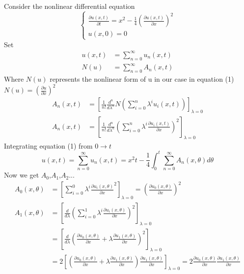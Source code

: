 \documentclass[]{article}
\begin{document}
\setcounter{equation}{0}
\begin{example}
    Consider the nonlinear differential equation
    \begin{equation}
        \begin{cases}
            \displaystyle \frac{\partial u(x,t)}{\partial t} = x^2 - \frac{1}{4}(\frac{\partial u(x,t)}{\partial x})^2
            \\
            \displaystyle u(x,0) = 0
        \end{cases}
    \end{equation}
    Set
    \begin{align*}
        u(x,t) & = \sum_{n=0}^{\infty} u_n(x,t)
        \\
        N(u)   & = \sum_{n=0}^{\infty} A_n(x,t)
    \end{align*}
    Where $N(u)$ represents the nonlinear form of u in our case in equation (1) $N(u) = \left(\frac{\partial u}{\partial x}\right)^2$
    \begin{align*}
        A_n(x,t) & = \left[\frac{1}{n!} \frac{d^n}{d \lambda^n} N\left(\sum_{i=0}^{n}  \lambda^i u_i(x,t)\right)\right]_{\lambda = 0}
        \\
        A_n(x,t) & = \left[\frac{1}{n!} \frac{d^n}{d \lambda^n} \left(\sum_{i=0}^{n}  \lambda^i \frac{\partial u_i(x,t)}{\partial x}\right)^2\right]_{\lambda = 0}
    \end{align*}
    Integrating equation (1) from $0 \to t$
    \[
        u(x,t) = \sum_{n=0}^{\infty} u_n(x,t)  = x^2t - \frac{1}{4} \int_{0}^{t}\sum_{n=0}^{\infty} A_n(x,\theta) d\theta
    \]
    Now we get $A_0$,$A_1$,$A_2$...
    \begin{align*}
        A_0(x,\theta) & = \left[\sum_{i=0}^{0}  \lambda^i \frac{\partial u_i(x,\theta)}{\partial x}^2\right]_{\lambda = 0} = \left(\frac{\partial u_0(x,\theta)}{\partial x}\right)^2
        \\
        A_1(x,\theta) & = \left[\frac{d}{d \lambda} \left(\sum_{i=0}^{1}  \lambda^i \frac{\partial u_i(x,\theta)}{\partial x}\right)^2\right]_{\lambda = 0}
        \\
                      & = \left[\frac{d}{d \lambda} \left(\frac{\partial u_0(x,\theta)}{\partial x} + \lambda \frac{\partial u_1(x,\theta)}{\partial x}\right)^2\right]_{\lambda = 0}
        \\
                      & =2\left[\left(\frac{\partial u_0(x,\theta)}{\partial x} + \lambda \frac{\partial u_1(x,\theta)}{\partial x}\right)\frac{\partial u_1(x,\theta)}{\partial x}\right]_{\lambda = 0} = 2\frac{\partial u_0(x,\theta)}{\partial x} \frac{\partial u_1(x,\theta)}{\partial x}

\end{align*}
\end{example}
\end{document}
